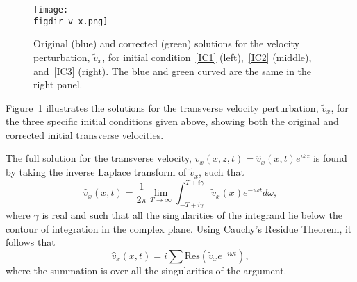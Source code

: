 \documentclass[12pt]{../style-files/ociamthesis}
\begin{document}
%
\begin{figure}
	\texttt{[image: \\figdir v\_x.png]}
	\caption{Original \cite{rae_etal81} (blue) and corrected (green) solutions for the velocity perturbation, $\tilde{v}_x$, for initial condition~\ref{IC1} (left),~\ref{IC2} (middle), and~\ref{IC3} (right). The blue and green curved are the same in the right panel.}
	\label{fig: vx}
\end{figure}
Figure~\ref{fig: vx} illustrates the solutions for the transverse velocity perturbation, $\tilde{v}_x$, for the three specific initial conditions given above, showing both the original and corrected initial transverse velocities.

The full solution for the transverse velocity, $v_x(x, z, t) = \hat{v}_x(x,t)e^{ikz}$ is found by taking the inverse Laplace transform of $\tilde{v}_x$, such that
\begin{equation}
\hat{v}_x(x,t) = \frac{1}{2\pi} \lim_{T \to \infty} \int_{-T+ i\gamma}^{T + i\gamma} \tilde{v}_x(x)e^{-i\omega t} d\omega,
\end{equation}
where $\gamma$ is real and such that all the singularities of the integrand lie below the contour of integration in the complex plane. Using Cauchy's Residue Theorem, it follows that
\begin{equation}
\hat{v}_x(x, t) = i\sum \mathrm{Res}(\tilde{v}_xe^{-i\omega t}),
\end{equation}
where the summation is over all the singularities of the argument. 
\end{document}
